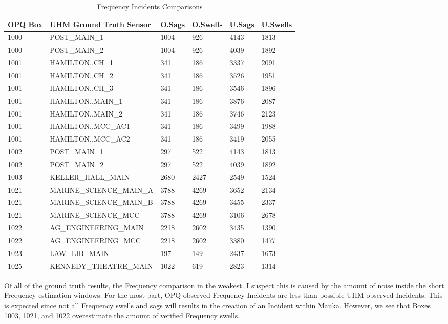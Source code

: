 \begin{table}[H]
    \centering
    \caption{Frequency Incidents Comparisons}
    \begin{tabularx}{\textwidth}{lXllll}
        \toprule
        \textbf{OPQ Box} & \textbf{UHM Ground Truth Sensor} & \textbf{O.Sags} & \textbf{O.Swells} & \textbf{U.Sags} & \textbf{U.Swells} \\
        \midrule
        1000 & POST\_MAIN\_1 & 1004 & 926 & 4143 & 1813 \\
        1000 & POST\_MAIN\_2 & 1004 & 926 & 4039 & 1892 \\
        1001 & HAMILTON..CH\_1 & 341 & 186 & 3337 & 2091 \\
        1001 & HAMILTON..CH\_2 & 341 & 186 & 3526 & 1951 \\
        1001 & HAMILTON..CH\_3 & 341 & 186 & 3546 & 1896 \\
        1001 & HAMILTON..MAIN\_1 & 341 & 186 & 3876 & 2087 \\
        1001 & HAMILTON..MAIN\_2 & 341 & 186 & 3746 & 2123 \\
        1001 & HAMILTON..MCC\_AC1 & 341 & 186 & 3499 & 1988 \\
        1001 & HAMILTON..MCC\_AC2 & 341 & 186 & 3419 & 2055 \\
        1002 & POST\_MAIN\_1 & 297 & 522 & 4143 & 1813 \\
        1002 & POST\_MAIN\_2 & 297 & 522 & 4039 & 1892 \\
        1003 & KELLER\_HALL\_MAIN & 2680 & 2427 & 2549 & 1524 \\
        1021 & MARINE\_SCIENCE\_MAIN\_A & 3788 & 4269 & 3652 & 2134 \\
        1021 & MARINE\_SCIENCE\_MAIN\_B & 3788 & 4269 & 3455 & 2337 \\
        1021 & MARINE\_SCIENCE\_MCC & 3788 & 4269 & 3106 & 2678 \\
        1022 & AG\_ENGINEERING\_MAIN & 2218 & 2602 & 3435 & 1390 \\
        1022 & AG\_ENGINEERING\_MCC & 2218 & 2602 & 3380 & 1477 \\
        1023 & LAW\_LIB\_MAIN & 197 & 149 & 2437 & 1673 \\
        1025 & KENNEDY\_THEATRE\_MAIN & 1022 & 619 & 2823 & 1314 \\
        \bottomrule
    \end{tabularx}
    \label{table:gt_f_incidents}
\end{table}

Of all of the ground truth results, the Frequency comparison in the weakest. I suspect this is caused by the amount of noise inside the short Frequency estimation windows. For the most part, OPQ observed Frequency Incidents are less than possible UHM observed Incidents. This is expected since not all Frequency swells and sags will results in the creation of an Incident within Mauka. However, we see that Boxes 1003, 1021, and 1022 overestimate the amount of verified Frequency swells.

